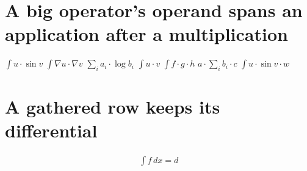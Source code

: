 \documentclass{article}
\begin{document}
\section{A big operator's operand spans an application after a multiplication}
$\int u\cdot\sin v$ $\int\nabla u\cdot\nabla v$ $\sum_i a_i\cdot\log b_i$ $\int u\cdot v$
$\int f\cdot g\cdot h$ $a\cdot\sum_i b_i\cdot c$ $\int u\cdot\sin v\cdot w$

\section{A gathered row keeps its differential}
\[\begin{gathered}\int f\,dx=d\end{gathered}\]

\end{document}
